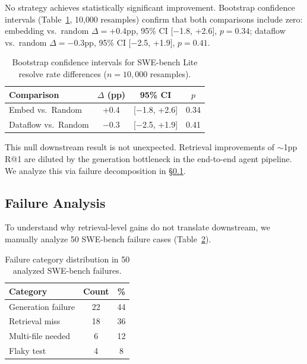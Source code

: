\documentclass[11pt,a4paper]{article}
\begin{document}
No strategy achieves statistically significant improvement. Bootstrap confidence intervals (Table~\ref{tab:bootstrap}, 10{,}000 resamples) confirm that both comparisons include zero: embedding vs.\ random $\Delta = +0.4$pp, 95\% CI [$-$1.8, +2.6], $p = 0.34$; dataflow vs.\ random $\Delta = -0.3$pp, 95\% CI [$-$2.5, +1.9], $p = 0.41$.

\begin{table}[t]
\centering
\small
\begin{tabular}{lccc}
\toprule
\textbf{Comparison} & \textbf{$\Delta$ (pp)} & \textbf{95\% CI} & \textbf{$p$} \\
\midrule
Embed vs.\ Random & +0.4 & [$-$1.8, +2.6] & 0.34 \\
Dataflow vs.\ Random & $-$0.3 & [$-$2.5, +1.9] & 0.41 \\
\bottomrule
\end{tabular}
\caption{Bootstrap confidence intervals for SWE-bench Lite resolve rate differences ($n = 10{,}000$ resamples).}
\label{tab:bootstrap}
\end{table}

This null downstream result is not unexpected. Retrieval improvements of $\sim$1pp R@1 are diluted by the generation bottleneck in the end-to-end agent pipeline. We analyze this via failure decomposition in \S\ref{sec:failure}.

\subsection{Failure Analysis}
\label{sec:failure}

To understand why retrieval-level gains do not translate downstream, we manually analyze 50 SWE-bench failure cases (Table~\ref{tab:failure_cats}).

\begin{table}[t]
\centering
\small
\begin{tabular}{lcc}
\toprule
\textbf{Category} & \textbf{Count} & \textbf{\%} \\
\midrule
Generation failure & 22 & 44 \\
Retrieval miss & 18 & 36 \\
Multi-file needed & 6 & 12 \\
Flaky test & 4 & 8 \\
\bottomrule
\end{tabular}
\caption{Failure category distribution in 50 analyzed SWE-bench failures.}
\label{tab:failure_cats}
\end{table}
\end{document}
